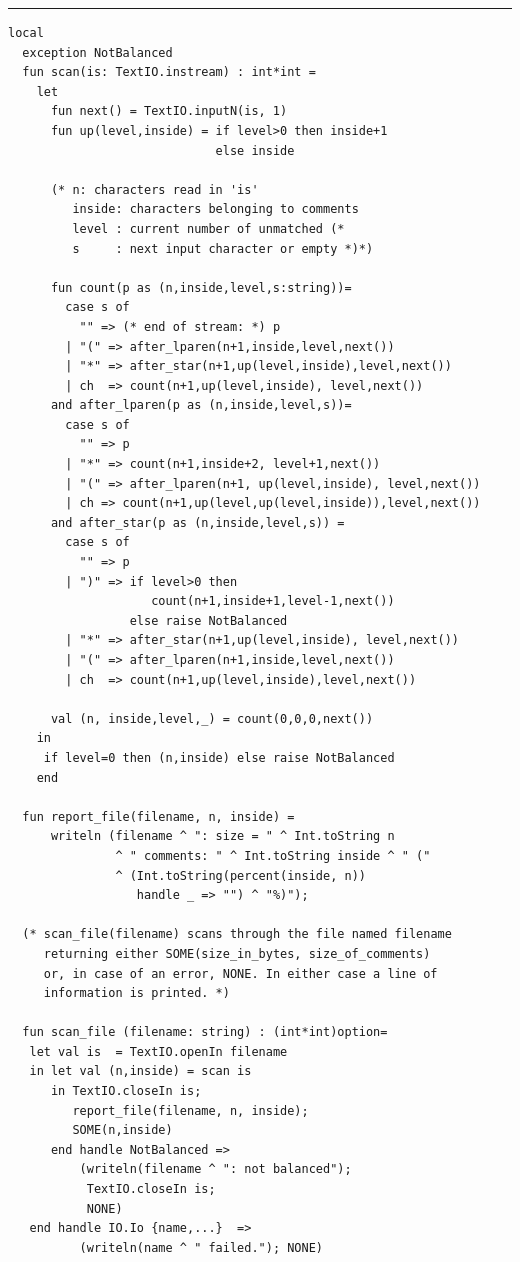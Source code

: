 \documentclass[12pt]{book}
\begin{document}
\pagebreak
\hrule
\begin{verbatim}
local
  exception NotBalanced
  fun scan(is: TextIO.instream) : int*int =
    let
      fun next() = TextIO.inputN(is, 1)
      fun up(level,inside) = if level>0 then inside+1 
                             else inside

      (* n: characters read in 'is'
         inside: characters belonging to comments
         level : current number of unmatched (* 
         s     : next input character or empty *)*)

      fun count(p as (n,inside,level,s:string))=
        case s of
          "" => (* end of stream: *) p
        | "(" => after_lparen(n+1,inside,level,next())
        | "*" => after_star(n+1,up(level,inside),level,next())
        | ch  => count(n+1,up(level,inside), level,next())
      and after_lparen(p as (n,inside,level,s))=
        case s of
          "" => p
        | "*" => count(n+1,inside+2, level+1,next())
        | "(" => after_lparen(n+1, up(level,inside), level,next())
        | ch => count(n+1,up(level,up(level,inside)),level,next())
      and after_star(p as (n,inside,level,s)) =
        case s of
          "" => p
        | ")" => if level>0 then
                    count(n+1,inside+1,level-1,next())
                 else raise NotBalanced
        | "*" => after_star(n+1,up(level,inside), level,next())
        | "(" => after_lparen(n+1,inside,level,next())
        | ch  => count(n+1,up(level,inside),level,next())
    
      val (n, inside,level,_) = count(0,0,0,next())
    in
     if level=0 then (n,inside) else raise NotBalanced
    end
  
  fun report_file(filename, n, inside) = 
      writeln (filename ^ ": size = " ^ Int.toString n
               ^ " comments: " ^ Int.toString inside ^ " ("
               ^ (Int.toString(percent(inside, n)) 
                  handle _ => "") ^ "%)");

  (* scan_file(filename) scans through the file named filename 
     returning either SOME(size_in_bytes, size_of_comments)
     or, in case of an error, NONE. In either case a line of
     information is printed. *)

  fun scan_file (filename: string) : (int*int)option=
   let val is  = TextIO.openIn filename 
   in let val (n,inside) = scan is
      in TextIO.closeIn is; 
         report_file(filename, n, inside);
         SOME(n,inside)
      end handle NotBalanced => 
          (writeln(filename ^ ": not balanced");
           TextIO.closeIn is;
           NONE)
   end handle IO.Io {name,...}  => 
          (writeln(name ^ " failed."); NONE)
  

\end{verbatim}
\end{document}
